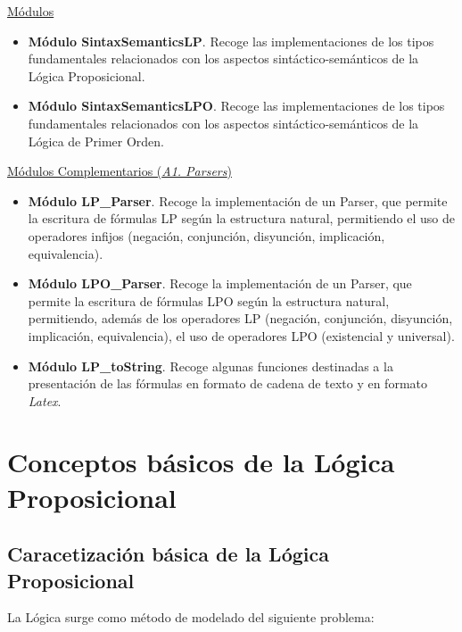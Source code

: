 \documentclass[a4paper]{report}
\begin{document}
\underline{Módulos}
\begin{itemize}
\item \textbf{Módulo SintaxSemanticsLP}. Recoge las implementaciones de los tipos fundamentales relacionados con los aspectos sintáctico-semánticos de la Lógica Proposicional.

\item \textbf{Módulo SintaxSemanticsLPO}. Recoge las implementaciones de los tipos fundamentales relacionados con los aspectos sintáctico-semánticos de la Lógica de Primer Orden.
\end{itemize}

\underline{Módulos Complementarios (\textit{A1. Parsers})}

\begin{itemize}
\item \textbf{Módulo LP\_Parser}. Recoge la implementación de un Parser, que permite la escritura de fórmulas LP según la estructura natural, permitiendo el uso de operadores infijos (negación, conjunción, disyunción, implicación, equivalencia).

\item \textbf{Módulo LPO\_Parser}. Recoge la implementación de un Parser, que permite la escritura de fórmulas LPO según la estructura natural, permitiendo, además de los operadores LP (negación, conjunción, disyunción, implicación, equivalencia), el uso de operadores LPO (existencial y universal).

\item \textbf{Módulo LP\_toString}. Recoge algunas funciones destinadas a la presentación de las fórmulas en formato de cadena de texto y en formato \textit{Latex}.
\end{itemize}

\section{Conceptos básicos de la Lógica Proposicional}

\subsection{Caracetización básica de la Lógica Proposicional}

La Lógica surge como método de modelado del siguiente problema:

\end{document}
